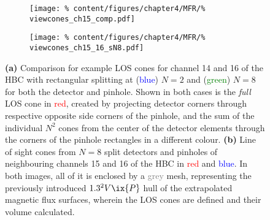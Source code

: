 %
            \begin{figure}[t]%
                \centering%
                \begin{subfigure}{0.47\textwidth}%
                    \texttt{[image: \%
                        content/figures/chapter4/MFR/\%
                        viewcones\_ch15\_comp.pdf]}%
                    \caption{}%
                \end{subfigure}%
                \hfill%
                \begin{subfigure}{0.47\textwidth}%
                    \texttt{[image: \%
                        content/figures/chapter4/MFR/\%
                        viewcones\_ch15\_16\_sN8.pdf]}%
                    \caption{}%
                \end{subfigure}%
                \caption{\textbf{(a)} Comparison for example LOS cones for channel 14 and 16 of the HBC with rectangular splitting at (\textcolor{blue}{blue}) $N=2$ and (\textcolor{green}{green}) $N=8$ for both the detector and pinhole. Shown in both cases is the \textit{full} LOS cone in \textcolor{red}{red}, created by projecting detector corners through respective opposite side corners of the pinhole, and the sum of the individual $N^{2}$ cones from the center of the detector elements through the corners of the pinhole rectangles in a different colour. \textbf{(b)} Line of sight cones from $N=8$ split detectors and pinholes of neighbouring channels 15 and 16 of the HBC in \textcolor{red}{red} and \textcolor{blue}{blue}. In both images, all of it is enclosed by a \textcolor{gray}{grey} mesh, representing the previously introduced $1.3^{2}V\ix{P}$ hull of the extrapolated magnetic flux surfaces, wherein the LOS cones are defined and their volume calculated.}\label{fig:viewconeComparison_N2_N8}%
            \end{figure}%
%
